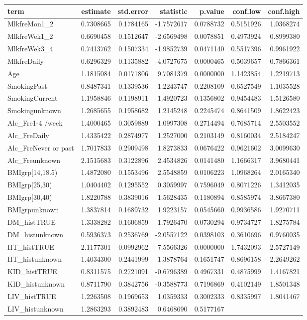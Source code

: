 \documentclass[]{article}
\begin{document}
\begin{longtable}[]{@{}lrrrrrr@{}}
\toprule
term & estimate & std.error & statistic & p.value & conf.low &
conf.high\tabularnewline
\midrule
\endhead
MlkfreMon1\_2 & 0.7308665 & 0.1784165 & -1.7572617 & 0.0788732 &
0.5151926 & 1.0368274\tabularnewline
MlkfreWek1\_2 & 0.6690458 & 0.1512647 & -2.6569498 & 0.0078851 &
0.4973924 & 0.8999380\tabularnewline
MlkfreWek3\_4 & 0.7413762 & 0.1507334 & -1.9852739 & 0.0471140 &
0.5517396 & 0.9961922\tabularnewline
MlkfreDaily & 0.6296329 & 0.1135882 & -4.0727675 & 0.0000465 & 0.5039657
& 0.7866361\tabularnewline
Age & 1.1815084 & 0.0171806 & 9.7081379 & 0.0000000 & 1.1423854 &
1.2219713\tabularnewline
SmokingPast & 0.8487341 & 0.1339536 & -1.2243747 & 0.2208109 & 0.6527549
& 1.1035528\tabularnewline
SmokingCurrent & 1.1958846 & 0.1198911 & 1.4920723 & 0.1356802 &
0.9454483 & 1.5126580\tabularnewline
Smokingunknown & 1.2685655 & 0.1958682 & 1.2145248 & 0.2245474 &
0.8641509 & 1.8622423\tabularnewline
Alc\_Fre1-4 /week & 1.4000465 & 0.3059889 & 1.0997308 & 0.2714494 &
0.7685714 & 2.5503552\tabularnewline
Alc\_FreDaily & 1.4335422 & 0.2874977 & 1.2527000 & 0.2103149 &
0.8160034 & 2.5184247\tabularnewline
Alc\_FreNever or past & 1.7017833 & 0.2909498 & 1.8273833 & 0.0676422 &
0.9621602 & 3.0099630\tabularnewline
Alc\_Freunknown & 2.1515683 & 0.3122896 & 2.4534826 & 0.0141480 &
1.1666317 & 3.9680441\tabularnewline
BMIgrp{[}14,18.5) & 1.4872080 & 0.1553496 & 2.5548859 & 0.0106223 &
1.0968264 & 2.0165340\tabularnewline
BMIgrp{[}25,30) & 1.0404402 & 0.1295552 & 0.3059997 & 0.7596049 &
0.8071226 & 1.3412035\tabularnewline
BMIgrp{[}30,40) & 1.8220788 & 0.3839016 & 1.5628435 & 0.1180894 &
0.8585974 & 3.8667380\tabularnewline
BMIgrpunknown & 1.3837814 & 0.1689732 & 1.9223157 & 0.0545660 &
0.9936586 & 1.9270711\tabularnewline
DM\_histTRUE & 1.3338282 & 0.1606859 & 1.7926470 & 0.0730294 & 0.9734727
& 1.8275784\tabularnewline
DM\_histunknown & 0.5936373 & 0.2536769 & -2.0557122 & 0.0398103 &
0.3610696 & 0.9760035\tabularnewline
HT\_histTRUE & 2.1177301 & 0.0992962 & 7.5566326 & 0.0000000 & 1.7432093
& 2.5727149\tabularnewline
HT\_histunknown & 1.4034300 & 0.2441999 & 1.3878764 & 0.1651747 &
0.8696158 & 2.2649262\tabularnewline
KID\_histTRUE & 0.8311575 & 0.2721091 & -0.6796389 & 0.4967331 &
0.4875999 & 1.4167821\tabularnewline
KID\_histunknown & 0.8711790 & 0.3842756 & -0.3588773 & 0.7196869 &
0.4102149 & 1.8501348\tabularnewline
LIV\_histTRUE & 1.2263508 & 0.1969653 & 1.0359333 & 0.3002333 &
0.8335997 & 1.8041467\tabularnewline
LIV\_histunknown & 1.2863293 & 0.3892483 & 0.6468690 & 0.5177167 &

\end{longtable}
\end{document}
